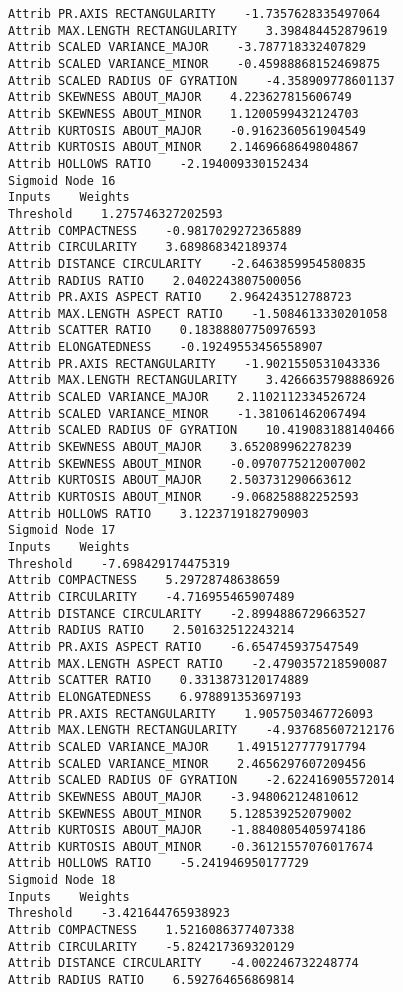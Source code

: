 \documentclass[
	article,			%
	11pt,				%
	oneside,			%
	a4paper,			%
	english,			%
	brazil,				%
	sumario=tradicional
	]{abntex2}
\begin{document}
\begin{lstlisting}
Attrib PR.AXIS RECTANGULARITY    -1.7357628335497064
Attrib MAX.LENGTH RECTANGULARITY    3.398484452879619
Attrib SCALED VARIANCE_MAJOR    -3.787718332407829
Attrib SCALED VARIANCE_MINOR    -0.45988868152469875
Attrib SCALED RADIUS OF GYRATION    -4.358909778601137
Attrib SKEWNESS ABOUT_MAJOR    4.223627815606749
Attrib SKEWNESS ABOUT_MINOR    1.1200599432124703
Attrib KURTOSIS ABOUT_MAJOR    -0.9162360561904549
Attrib KURTOSIS ABOUT_MINOR    2.1469668649804867
Attrib HOLLOWS RATIO    -2.194009330152434
Sigmoid Node 16
Inputs    Weights
Threshold    1.275746327202593
Attrib COMPACTNESS    -0.9817029272365889
Attrib CIRCULARITY    3.689868342189374
Attrib DISTANCE CIRCULARITY    -2.6463859954580835
Attrib RADIUS RATIO    2.0402243807500056
Attrib PR.AXIS ASPECT RATIO    2.964243512788723
Attrib MAX.LENGTH ASPECT RATIO    -1.5084613330201058
Attrib SCATTER RATIO    0.18388807750976593
Attrib ELONGATEDNESS    -0.19249553456558907
Attrib PR.AXIS RECTANGULARITY    -1.9021550531043336
Attrib MAX.LENGTH RECTANGULARITY    3.4266635798886926
Attrib SCALED VARIANCE_MAJOR    2.1102112334526724
Attrib SCALED VARIANCE_MINOR    -1.381061462067494
Attrib SCALED RADIUS OF GYRATION    10.419083188140466
Attrib SKEWNESS ABOUT_MAJOR    3.652089962278239
Attrib SKEWNESS ABOUT_MINOR    -0.0970775212007002
Attrib KURTOSIS ABOUT_MAJOR    2.503731290663612
Attrib KURTOSIS ABOUT_MINOR    -9.068258882252593
Attrib HOLLOWS RATIO    3.1223719182790903
Sigmoid Node 17
Inputs    Weights
Threshold    -7.698429174475319
Attrib COMPACTNESS    5.29728748638659
Attrib CIRCULARITY    -4.716955465907489
Attrib DISTANCE CIRCULARITY    -2.8994886729663527
Attrib RADIUS RATIO    2.501632512243214
Attrib PR.AXIS ASPECT RATIO    -6.654745937547549
Attrib MAX.LENGTH ASPECT RATIO    -2.4790357218590087
Attrib SCATTER RATIO    0.3313873120174889
Attrib ELONGATEDNESS    6.978891353697193
Attrib PR.AXIS RECTANGULARITY    1.9057503467726093
Attrib MAX.LENGTH RECTANGULARITY    -4.937685607212176
Attrib SCALED VARIANCE_MAJOR    1.4915127777917794
Attrib SCALED VARIANCE_MINOR    2.4656297607209456
Attrib SCALED RADIUS OF GYRATION    -2.622416905572014
Attrib SKEWNESS ABOUT_MAJOR    -3.948062124810612
Attrib SKEWNESS ABOUT_MINOR    5.128539252079002
Attrib KURTOSIS ABOUT_MAJOR    -1.8840805405974186
Attrib KURTOSIS ABOUT_MINOR    -0.36121557076017674
Attrib HOLLOWS RATIO    -5.241946950177729
Sigmoid Node 18
Inputs    Weights
Threshold    -3.421644765938923
Attrib COMPACTNESS    1.5216086377407338
Attrib CIRCULARITY    -5.824217369320129
Attrib DISTANCE CIRCULARITY    -4.002246732248774
Attrib RADIUS RATIO    6.592764656869814

\end{lstlisting}
\end{document}
